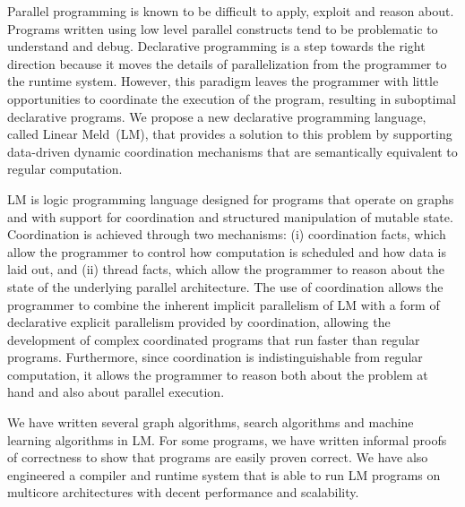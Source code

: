 Parallel programming is known to be difficult to apply, exploit and reason
about. Programs written using low level parallel constructs tend to be
problematic to understand and debug. Declarative programming is a step towards
the right direction because it moves the details of parallelization from the
programmer to the runtime system. However, this paradigm leaves the programmer
with little opportunities to coordinate the execution of the program, resulting
in suboptimal declarative programs.  We propose a new declarative programming
language, called Linear Meld~(LM), that provides a solution to this problem by
supporting data-driven dynamic coordination mechanisms that are semantically
equivalent to regular computation.

LM is logic programming language designed for programs that operate on graphs
and with support for coordination and structured manipulation of mutable state.
Coordination is achieved through two mechanisms: (i) coordination facts, which
allow the programmer to control how computation is scheduled and how data is
laid out, and (ii) thread facts, which allow the programmer to reason about the
state of the underlying parallel architecture.  The use of coordination allows the
programmer to combine the inherent implicit parallelism of LM with a form of
declarative explicit parallelism provided by coordination, allowing the
development of complex coordinated programs that run faster than regular
programs. Furthermore, since coordination is indistinguishable from regular
computation, it allows the programmer to reason both about the problem at hand
and also about parallel execution.

We have written several graph algorithms, search algorithms and machine learning
algorithms in LM. For some programs, we have written informal proofs of
correctness to show that programs are easily proven correct. We have also
engineered a compiler and runtime system that is able to run LM programs on
multicore architectures with decent performance and scalability.
